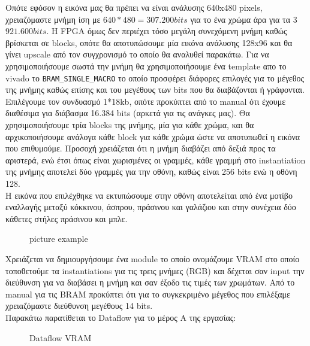 \documentclass[12pt,a4paper]{article}
\begin{document}
	Οπότε εφόσον η εικόνα μας θα πρέπει να είναι ανάλυσης 640x480 pixels, χρειαζόμαστε μνήμη ίση με $640*480 = 307.200 bits$ για το ένα χρώμα άρα για τα 3 $921.600 bits$. Η FPGA όμως δεν περιέχει τόσο μεγάλη συνεχόμενη μνήμη καθώς βρίσκεται σε blocks, οπότε θα αποτυπώσουμε μία εικόνα ανάλυσης 128x96 και θα γίνει upscale από τον συγχρονισμό το οποίο θα αναλυθεί παρακάτω. Για να χρησιμοποιήσουμε σωστά την μνήμη θα χρησιμοποιήσουμε ένα template απο το vivado το \verb*|BRAM_SINGLE_MACRO| το οποίο προσφέρει διάφορες επιλογές για το μέγεθος της μνήμης καθώς επίσης και του μεγέθους των bits που θα διαβάζονται ή γράφονται. Επιλέγουμε τον συνδυασμό 1*18kb, οπότε προκύπτει από το manual ότι έχουμε διαθέσιμα για διάβασμα 16.384 bits (αρκετά για τις ανάγκες μας). Θα χρησιμοποιήσουμε τρία blocks της μνήμης, μία για κάθε χρώμα, και θα αρχικοποιήσουμε ανάλογα κάθε block για κάθε χρώμα ώστε να αποτυπωθεί η εικόνα που επιθυμούμε. Προσοχή χρειάζεται ότι η μνήμη διαβάζει από δεξιά προς τα αριστερά, ενώ έτσι όπως είναι χωρισμένες οι γραμμές, κάθε γραμμή στο instantiation της μνήμης αποτελεί δύο γραμμές για την οθόνη, καθώς είναι 256 bits ενώ η οθόνη 128.\\
	Η εικόνα που επιλέχθηκε να εκτυπώσουμε στην οθόνη αποτελείται από ένα μοτίβο εναλλαγής μεταξύ κόκκινου, άσπρου, πράσινου και γαλάζιου και στην συνέχεια δύο κάθετες στήλες πράσινου και μπλε.
	\begin{figure} [htbp]
		\caption{picture example}
		\label{picture example}
	\end{figure}	
	
	Χρειάζεται να δημιουργήσουμε ένα module το οποίο ονομάζουμε VRAM στο οποίο τοποθετούμε τα instantiations για τις τρεις μνήμες (RGB) και δέχεται σαν input την διεύθυνση για να διαβάσει η μνήμη και σαν έξοδο τις τιμές των χρωμάτων. Από το manual για τις BRAM προκύπτει ότι για το συγκεκριμένο μέγεθος που επιλέξαμε χρειαζόμαστε διεύθυνση μεγέθους  14 bits. \\
	Παρακάτω παρατίθεται το Dataflow για το μέρος Α της εργασίας:
	\begin{figure} [H]
		\caption{Dataflow VRAM}
		\label{Dataflow VRAM}
	\end{figure}
	
\end{document}
